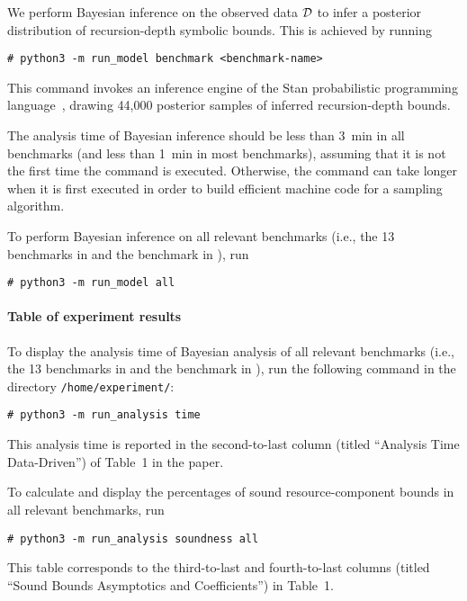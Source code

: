 We perform Bayesian inference on the observed data $\mathcal{D}$ to infer a posterior
distribution of recursion-depth symbolic bounds.
%
This is achieved by running
\begin{verbatim}
# python3 -m run_model benchmark <benchmark-name>
\end{verbatim}
%
This command invokes an inference engine of the Stan probabilistic programming
language~\citep{Carpenter2017}, drawing 44,000 posterior samples of inferred
recursion-depth bounds.

The analysis time of Bayesian inference should be less than \qty{3}{\minute} in
all benchmarks (and less than \qty{1}{\minute} in most benchmarks), assuming
that it is not the first time the command is executed.
%
Otherwise, the command can take longer when it is first executed in order to
build efficient machine code for a sampling algorithm.

To perform Bayesian inference on all relevant benchmarks (i.e., the 13
benchmarks in  and the benchmark
\quicksorttiml{} in ), run
\begin{verbatim}
# python3 -m run_model all
\end{verbatim}

\paragraph{Table of experiment results}

To display the analysis time of Bayesian analysis of all relevant benchmarks
(i.e., the 13 benchmarks in  and the
benchmark \quicksorttiml{} in ), run the
following command in the directory \texttt{/home/experiment/}:
\begin{verbatim}
# python3 -m run_analysis time
\end{verbatim}
%
This analysis time is reported in the second-to-last column (titled ``Analysis
Time Data-Driven'') of Table~1 in the paper.

To calculate and display the percentages of sound resource-component bounds in
all relevant benchmarks, run
\begin{verbatim}
# python3 -m run_analysis soundness all
\end{verbatim}
%
This table corresponds to the third-to-last and fourth-to-last columns (titled
``Sound Bounds Asymptotics and Coefficients'') in Table~1.

